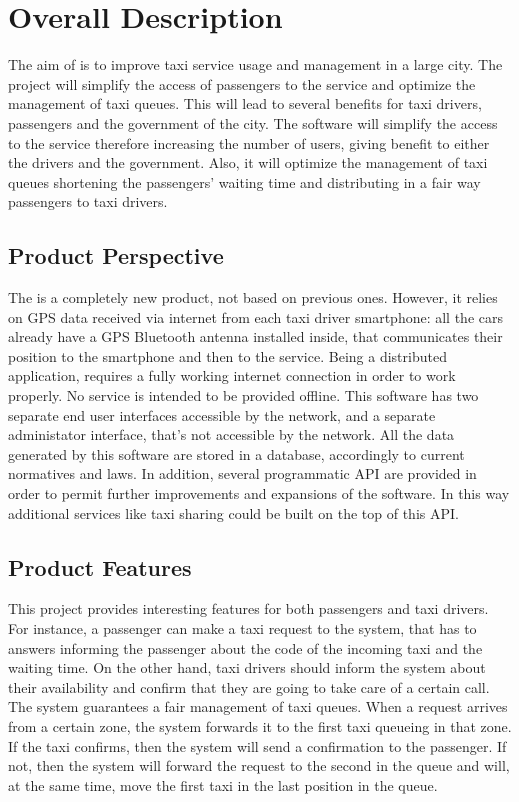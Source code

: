 \section{Overall Description}
The aim of \myTaxiService{} is to improve taxi service usage and management in a large city.
The project will simplify the access of passengers to the service and optimize the management of taxi queues.
This will lead to several benefits for taxi drivers, passengers and the government of the city.
The software will simplify the access to the service therefore increasing the number of users, giving benefit to either the drivers and the government.
Also, it will optimize the management of taxi queues shortening the passengers’ waiting time and distributing in a fair way passengers to taxi drivers.
\subsection{Product Perspective}
The \myTaxiService{} is a completely new product, not based on previous ones.
However, it relies on GPS data received via internet from each taxi driver smartphone: all the cars already have a GPS Bluetooth antenna installed inside, that communicates their position to the smartphone and then to the service.
Being a distributed application, \myTaxiService{} requires a fully working internet connection in order to work properly.
No service is intended to be provided offline.
This software has two separate end user interfaces accessible by the network, and a separate administator interface, that's not accessible by the network.
All the data generated by this software are stored in a database, accordingly to current normatives and laws.
In addition, several programmatic API are provided in order to permit further improvements and expansions of the software.
In this way additional services like taxi sharing could be built on the top of this API.
\subsection{Product Features}
This project provides interesting features for both passengers and taxi drivers.
For instance, a passenger can make a taxi request to the system, that has to answers informing the passenger about the code of the incoming taxi and the waiting time.
On the other hand, taxi drivers should inform the system about their availability and confirm that they are going to take care of a certain call. The system guarantees a fair management of taxi queues.
When a request arrives from a certain zone, the system forwards it to the first taxi queueing in that zone.
If the taxi confirms, then the system will send a confirmation to the passenger.
If not, then the system will forward the request to the second in the queue and will, at the same time, move the first taxi in the last position in the queue.
